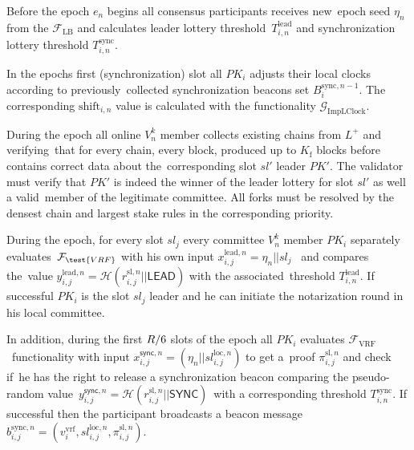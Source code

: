\begin{legal}
    \item Before the epoch $e_n$ begins all consensus participants receives new\
    epoch seed $\eta_n$ from the ${\mathcal{F}}_{\text{LB}}$ and calculates leader lottery threshold\
    $T_{i, n}^{\text{lead}}$ and synchronization lottery threshold $T_{i, n}^{\text{sync}}$.

    \item In the epochs first (synchronization) slot all $PK_i$ adjusts their local clocks according to previously\
    collected synchronization beacons set $B_i^{\text{sync}, n - 1}$.
    The corresponding $\text{shift}_{i, n}$ value is calculated with the functionality $\mathcal{G}_{\text{ImpLClock}}$.

    \item During the epoch all online $V^k_n$ member collects existing chains from $L^+$ and verifying\
    that for every chain, every block, produced up to $K_{\text{f}}$ blocks before contains correct data about the\
    corresponding slot $sl'$ leader $PK'$.
    The validator must verify that $PK'$ is indeed the winner of the leader lottery for slot $sl'$ as well a valid\
    member of the legitimate committee.
    All forks must be resolved by the densest chain and largest stake rules in the corresponding priority.

    \item During the epoch, for every slot $sl_j$ every committee $V^k_n$ member $PK_i$ separately evaluates\
    ${\mathcal{F}}_{\test{VRF}}$ with his own input ${x_{i, j}^{\text{lead}, n} = \eta_n || sl_j}$ \ and compares the\
    value ${y_{i, j}^{\text{lead}, n} = \mathcal{H}(r_{i, j}^{\text{sl}, n}||\textsf{LEAD})}$ with the associated\
    threshold $T_{i, n}^{\text{lead}}$.
    If successful $PK_i$ is the slot $sl_j$ leader and he can initiate the notarization round in his local committee.

    In addition, during the first $R\//6$ slots of the epoch all $PK_i$ evaluates $\mathcal{F}_{\text{VRF}}$\
    functionality with input ${x_{i, j}^{\textsf{sync}, n} = (\eta_n || sl_{i, j}^{\text{loc}, n})}$ to get a\
    proof $\pi_{i, j}^{\text{sl}, n}$ and check if\
    he has the right to release a synchronization beacon comparing the pseudo-random value\
    ${y_{i, j}^{\textsf{sync}, n} = \mathcal{H}(r_{i, j}^{\text{sl}, n} || \textsf{SYNC})}$\
    with a corresponding threshold $T_{i, n}^{\text{sync}}$.
    If successful then the participant broadcasts a beacon message\
    $b_{i, j}^{\text{sync}, n} = (v^{\text{vrf}}_i, sl_{i, j}^{\text{loc}, n}, \pi_{i, j}^{\text{sl}, n})$.


\end{legal}
